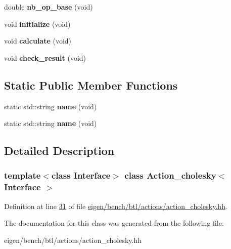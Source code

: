 \begin{DoxyCompactItemize}
\item 
\mbox{\label{class_action__cholesky_adb4d5872b54ef3704dc018ab02cd494d}} 
double {\bfseries nb\+\_\+op\+\_\+base} (void)
\item 
\mbox{\label{class_action__cholesky_aba488d820317e2a8ad65bad477d0525b}} 
void {\bfseries initialize} (void)
\item 
\mbox{\label{class_action__cholesky_aa16837f8c6f05f93b26625e606011899}} 
void {\bfseries calculate} (void)
\item 
\mbox{\label{class_action__cholesky_ae55c8b5159bb9458987b0ab9f50edc38}} 
void {\bfseries check\+\_\+result} (void)
\end{DoxyCompactItemize}
\subsection*{Static Public Member Functions}
\begin{DoxyCompactItemize}
\item 
\mbox{\label{class_action__cholesky_a036450526ae167da5dc5e17b79d70bee}} 
static std\+::string {\bfseries name} (void)
\item 
\mbox{\label{class_action__cholesky_a036450526ae167da5dc5e17b79d70bee}} 
static std\+::string {\bfseries name} (void)
\end{DoxyCompactItemize}


\subsection{Detailed Description}
\subsubsection*{template$<$class Interface$>$\newline
class Action\+\_\+cholesky$<$ Interface $>$}



Definition at line \hyperlink{eigen_2bench_2btl_2actions_2action__cholesky_8hh_source_l00031}{31} of file \hyperlink{eigen_2bench_2btl_2actions_2action__cholesky_8hh_source}{eigen/bench/btl/actions/action\+\_\+cholesky.\+hh}.



The documentation for this class was generated from the following file\+:\begin{DoxyCompactItemize}
\item 
eigen/bench/btl/actions/action\+\_\+cholesky.\+hh\end{DoxyCompactItemize}
